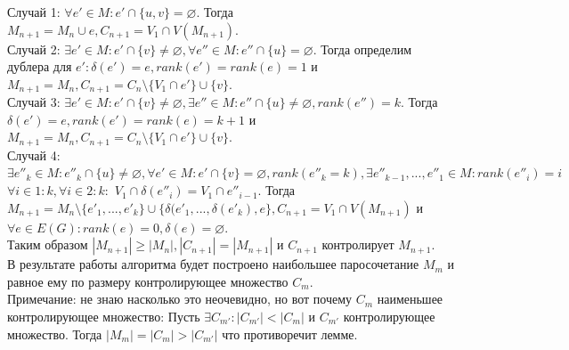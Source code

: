 Случай 1: $\forall e' \in M: e' \cap \{u, v\} = \varnothing$. Тогда $M_{n + 1} = M_n \cup {e}, C_{n + 1} = V_1 \cap V(M_{n + 1})$.\\
Случай 2: $\exists e' \in M: e' \cap \{v\} \neq \varnothing, \forall e'' \in M: e'' \cap \{u\} = \varnothing$. Тогда определим дублера для $e': \delta(e') = e, rank(e') = rank(e) = 1$ и $M_{n + 1} = M_n, C_{n + 1} = C_n \setminus \{V_1 \cap e'\} \cup \{v\}$.\\
Случай 3: $\exists e' \in M: e' \cap \{v\} \neq \varnothing, \exists e'' \in M: e'' \cap \{u\} \neq \varnothing, rank(e'') = k$. Тогда $\delta(e') = e, rank(e') = rank(e) = k + 1$ и $M_{n + 1} = M_n, C_{n + 1} = C_n \setminus \{V_1 \cap e'\} \cup \{v\}$.\\
Случай 4: $\exists e''_k \in M: e''_k \cap \{u\} \neq \varnothing, \forall e' \in M: e' \cap \{v\} = \varnothing, rank(e''_k = k), \exists e''_{k - 1}, ..., e''_1 \in M: rank(e''_i) = i$ $ \forall i \in 1:k, \forall i \in 2:k:$ $V_1 \cap \delta(e''_i) = V_1 \cap e''_{i - 1}$. Тогда $M_{n + 1} = M_n \setminus \{e'_1, ..., e'_k\} \cup \{\delta(e'_1, ..., \delta(e'_k), e\}, C_{n + 1} = V_1 \cap V(M_{n + 1})$ и $\forall e \in E(G): rank(e) = 0, \delta(e) = \varnothing$.\\
Таким образом $|M_{n + 1}|\geq |M_n|, |C_{n + 1}| = |M_{n + 1}|$ и $C_{n + 1}$ контролирует $M_{n + 1}$.\\
В результате работы алгоритма будет построено наибольшее паросочетание $M_m$ и равное ему по размеру контролирующее множество $C_m$.\\
Примечание: не знаю насколько это неочевидно, но вот почему $C_m$ наименьшее контролирующее множество: Пусть $\exists C_{m'}: |C_{m'}| < |C_m|$ и $C_{m'}$ контролирующее множество. Тогда $|M_m| = |C_m| > |C_{m'}|$ что противоречит лемме.

